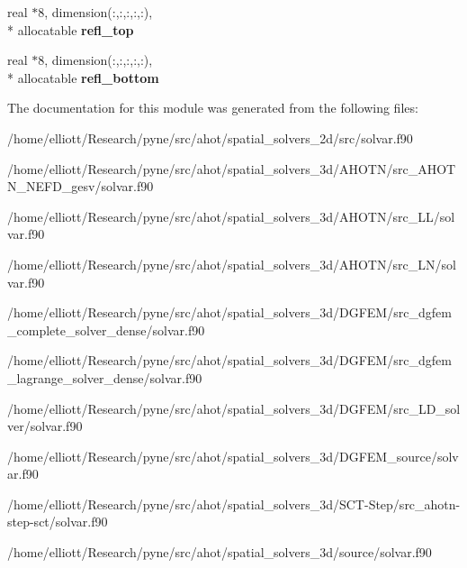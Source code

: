 \begin{DoxyCompactItemize}
\item 
\hypertarget{classsolvar_af29eb10335c7759fed480c446ebfc589}{real $\ast$8, dimension(\-:,\-:,\-:,\-:,\-:), \\*
allocatable {\bfseries refl\-\_\-top}}\label{classsolvar_af29eb10335c7759fed480c446ebfc589}

\item 
\hypertarget{classsolvar_a5ce62c4bd849dd94ecdcea30ff3de1be}{real $\ast$8, dimension(\-:,\-:,\-:,\-:,\-:), \\*
allocatable {\bfseries refl\-\_\-bottom}}\label{classsolvar_a5ce62c4bd849dd94ecdcea30ff3de1be}

\end{DoxyCompactItemize}


The documentation for this module was generated from the following files\-:\begin{DoxyCompactItemize}
\item 
/home/elliott/\-Research/pyne/src/ahot/spatial\-\_\-solvers\-\_\-2d/src/solvar.\-f90\item 
/home/elliott/\-Research/pyne/src/ahot/spatial\-\_\-solvers\-\_\-3d/\-A\-H\-O\-T\-N/src\-\_\-\-A\-H\-O\-T\-N\-\_\-\-N\-E\-F\-D\-\_\-gesv/solvar.\-f90\item 
/home/elliott/\-Research/pyne/src/ahot/spatial\-\_\-solvers\-\_\-3d/\-A\-H\-O\-T\-N/src\-\_\-\-L\-L/solvar.\-f90\item 
/home/elliott/\-Research/pyne/src/ahot/spatial\-\_\-solvers\-\_\-3d/\-A\-H\-O\-T\-N/src\-\_\-\-L\-N/solvar.\-f90\item 
/home/elliott/\-Research/pyne/src/ahot/spatial\-\_\-solvers\-\_\-3d/\-D\-G\-F\-E\-M/src\-\_\-dgfem\-\_\-complete\-\_\-solver\-\_\-dense/solvar.\-f90\item 
/home/elliott/\-Research/pyne/src/ahot/spatial\-\_\-solvers\-\_\-3d/\-D\-G\-F\-E\-M/src\-\_\-dgfem\-\_\-lagrange\-\_\-solver\-\_\-dense/solvar.\-f90\item 
/home/elliott/\-Research/pyne/src/ahot/spatial\-\_\-solvers\-\_\-3d/\-D\-G\-F\-E\-M/src\-\_\-\-L\-D\-\_\-solver/solvar.\-f90\item 
/home/elliott/\-Research/pyne/src/ahot/spatial\-\_\-solvers\-\_\-3d/\-D\-G\-F\-E\-M\-\_\-source/solvar.\-f90\item 
/home/elliott/\-Research/pyne/src/ahot/spatial\-\_\-solvers\-\_\-3d/\-S\-C\-T-\/\-Step/src\-\_\-ahotn-\/step-\/sct/solvar.\-f90\item 
/home/elliott/\-Research/pyne/src/ahot/spatial\-\_\-solvers\-\_\-3d/source/solvar.\-f90\end{DoxyCompactItemize}
